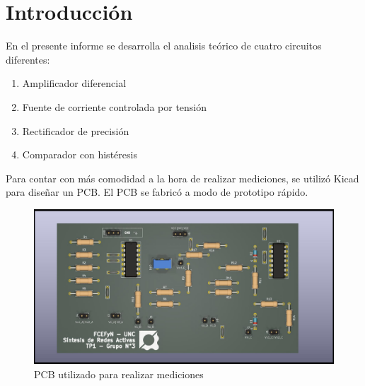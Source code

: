 \documentclass{article}
\begin{document}

\newpage

\tableofcontents
\newpage



\section{Introducción}

En el presente informe se desarrolla el analisis teórico de cuatro circuitos diferentes: 

\begin{enumerate}
    \item Amplificador diferencial
    \item Fuente de corriente controlada por tensión
    \item Rectificador de precisión
    \item Comparador con histéresis
\end{enumerate}

Para contar con más comodidad a la hora de realizar mediciones, se utilizó Kicad para diseñar un PCB. El PCB se fabricó a modo de prototipo rápido.

\begin{figure}[H]
    \centering
    \includegraphics[width=1\linewidth]{LABN1_SRA.jpg}
    \caption{PCB utilizado para realizar mediciones}
    \label{fig:enter-label}
\end{figure}


\newpage


\newpage

 
\newpage


\newpage



\printbibliography
\end{document}
